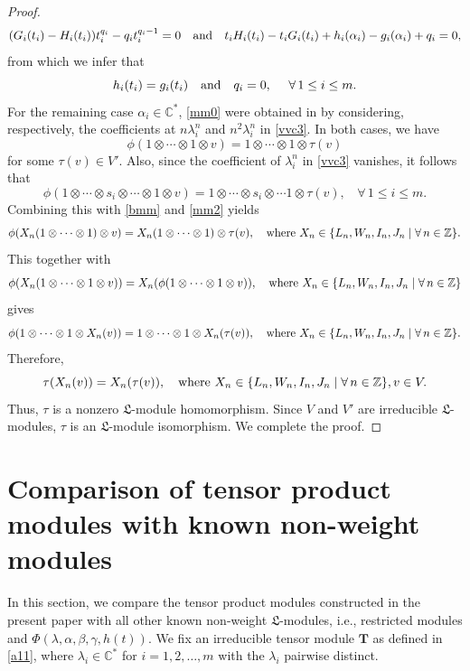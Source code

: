 \documentclass[12pt,leqno,amscd,amsfonts,amssymb]{amsart}
\def\a{\alpha}
\def\b{\beta}
\def\r{\gamma}
\def\Z{\mathbb{Z}}
\def\C{\mathbb{C}}
\numberwithin{equation}{section}
\begin{document}
\begin{proof}
\begin{equation*}(G_{i}(t_{i})-H_{i}(t_{i}))t_i^{q_i}-q_{i}t_{i}^{q_i-1}=0 \quad {\rm and}\quad t_iH_i(t_i)-t_iG_i(t_i)+h_i(\a_i)-g_i(\a_i)+q_i=0,\end{equation*}
from which we infer  that 
\begin{equation}\label{mm0}h_i(t_i)=g_i(t_i)\quad {\rm and} \quad q_i=0,\ \ \ \ \forall\,1\leq i \leq m. \end{equation}
For the remaining case  $\a_i\in\C^*$, \eqref{mm0} were obtained in \cite[Theorem 3.6]{CX} by considering, respectively, the coefficients at $n\lambda_i^n$  and $n^2\lambda_i^n$ in \eqref{vvc3}. In both cases, we have
\begin{equation}\label{mm2}\phi(1\otimes\cdots \otimes1 \otimes v)=1\otimes\cdots \otimes1 \otimes \tau(v)\end{equation}
for some $\tau(v)\in V'$. Also, since the coefficient of $\lambda_i^n$ in  \eqref{vvc3}  vanishes, it follows that
\begin{equation*}\label{mm3}\phi(1\otimes\cdots \otimes s_i\otimes\cdots \otimes1 \otimes v)=1\otimes\cdots \otimes s_i\otimes\cdots1 \otimes \tau(v), \ \ \ \ \forall\,1\leq i\leq m.\end{equation*}
Combining this with \eqref{bmm} and \eqref{mm2} yields 
\begin{equation*}
\phi(X_n (1\otimes\cdots \otimes1)\otimes v)=X_n(1\otimes\cdots \otimes1 )\otimes\tau(v), \quad{\rm where}\,\,X_n\in\{L_n, W_n, I_n, J_n\mid\forall\,n\in\Z\}.
\end{equation*}
This together with
$$\phi(X_n (1\otimes\cdots \otimes1\otimes v))=X_n (\phi(1\otimes\cdots \otimes1\otimes v)),\quad{\rm where}\,\,X_n\in\{L_n, W_n, I_n, J_n\mid\forall\,n\in\Z\}$$
gives
$$\phi(1\otimes\cdots \otimes1\otimes X_n( v))=1\otimes\cdots \otimes1\otimes X_n(\tau(v)),\quad{\rm where}\,\,X_n\in\{L_n, W_n, I_n, J_n\mid\forall\,n\in\Z\}.$$
Therefore,
$$\tau(X_n (v))=X_n(\tau(v)),\quad{\rm where}\,\,X_n\in\{L_n, W_n, I_n, J_n\mid\forall\, n\in\Z\}, v\in V.$$
Thus, $\tau$ is a nonzero $\mathfrak L$-module homomorphism. Since $V$ and $V'$ are irreducible $\mathfrak L$-modules, $\tau$ is an  $\mathfrak L$-module isomorphism.  We complete the proof.
\end{proof}
	
\section{Comparison of tensor product modules with known non-weight modules}
In this section, we compare the tensor product modules constructed in the present paper with all other known non-weight $\mathfrak L$-modules, i.e., restricted modules and $\Phi(\lambda,\a,\b,\r,h(t))$. We fix an irreducible tensor module $\bm{T}$ as defined in \eqref{a11}, where $\lambda_i\in \C^*$ for $i=1, 2, \ldots, m$ with the $\lambda_i$ pairwise distinct.
	
\end{document}
